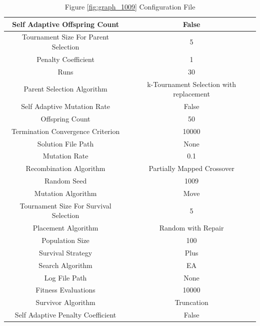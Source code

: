 \documentclass{standalone}
\begin{document}
\begin{table}[!htb]
	\centering
	\caption{Figure \ref{fig:graph_1009} Configuration File}
	\label{tab:graph_1009}
	\begin{tabular}{| c | c |}
		\hline
		Self Adaptive Offspring Count		& False		 \\
		\hline
		Tournament Size For Parent Selection		& 5		 \\
		\hline
		Penalty Coefficient		& 1		 \\
		\hline
		Runs		& 30		 \\
		\hline
		Parent Selection Algorithm		& k-Tournament Selection with replacement		 \\
		\hline
		Self Adaptive Mutation Rate		& False		 \\
		\hline
		Offspring Count		& 50		 \\
		\hline
		Termination Convergence Criterion		& 10000		 \\
		\hline
		Solution File Path		& None		 \\
		\hline
		Mutation Rate		& 0.1		 \\
		\hline
		Recombination Algorithm		& Partially Mapped Crossover		 \\
		\hline
		Random Seed		& 1009		 \\
		\hline
		Mutation Algorithm		& Move		 \\
		\hline
		Tournament Size For Survival Selection		& 5		 \\
		\hline
		Placement Algorithm		& Random with Repair		 \\
		\hline
		Population Size		& 100		 \\
		\hline
		Survival Strategy		& Plus		 \\
		\hline
		Search Algorithm		& EA		 \\
		\hline
		Log File Path		& None		 \\
		\hline
		Fitness Evaluations		& 10000		 \\
		\hline
		Survivor Algorithm		& Truncation		 \\
		\hline
		Self Adaptive Penalty Coefficient		& False		 \\
		\hline
	\end{tabular}
\end{table}
\end{document}
